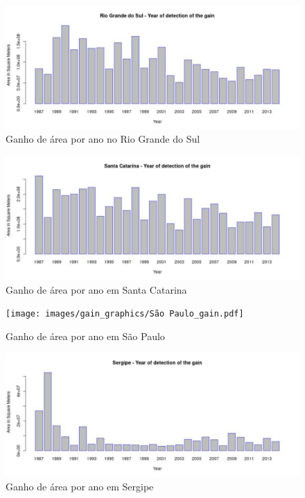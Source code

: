 \begin{figure}[H]
    \centering
    \includegraphics[scale=.5]{images/gain_graphics/Rio Grande do Sul_gain.pdf}
    \caption{Ganho de área por ano no Rio Grande do Sul}
    \label{fig:gain_rio_grande_do_sul}
\end{figure}

\begin{figure}[H]
    \centering
    \includegraphics[scale=.5]{images/gain_graphics/Santa Catarina_gain.pdf}
    \caption{Ganho de área por ano em Santa Catarina}
    \label{fig:gain_santa_catarina}
\end{figure}

\begin{figure}[H]
    \centering
    \texttt{[image: images/gain\_graphics/São Paulo\_gain.pdf]}
    \caption{Ganho de área por ano em São Paulo}
    \label{fig:gain_sao_paulo}
\end{figure}

\begin{figure}[H]
    \centering
    \includegraphics[scale=.5]{images/gain_graphics/Sergipe_gain.pdf}
    \caption{Ganho de área por ano em Sergipe}
    \label{fig:gain_sergipe}
\end{figure}
